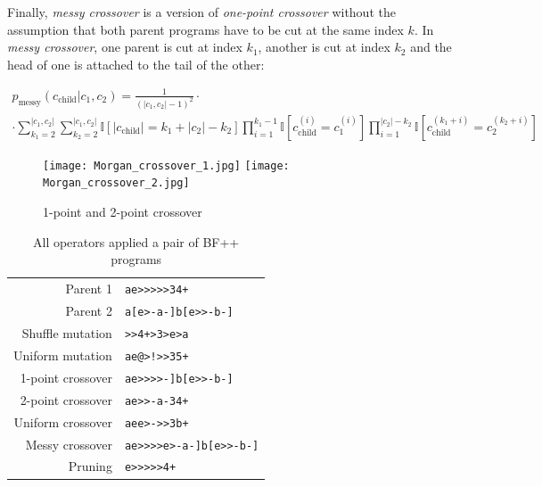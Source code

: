 Finally, \emph{messy crossover} is a version of \emph{one-point crossover} without the assumption that both parent programs have to be cut at the same index $k$.
In \emph{messy crossover}, one parent is cut at index $k_1$, another is cut at index $k_2$ and the head of one is attached to the tail of the other:

\begin{multline}
    p_\text{messy}(c_\text{child}|c_1,c_2) = \frac{1}{(|c_1,c_2|-1)^2} \cdot \\ \cdot \sum\limits_{k_1=2}^{|c_1,c_2|} \sum\limits_{k_2=2}^{|c_1,c_2|} \mathbb{I}[|c_\text{child}|=k_1+|c_2|-k_2] \prod\limits_{i=1}^{k_1-1} \mathbb{I}[c_\text{child}^{(i)} = c_1^{(i)}] \prod\limits_{i=1}^{|c_2|-k_2} \mathbb{I}[c_\text{child}^{(k_1+i)} = c_2^{(k_2+i)}]
\end{multline}

\begin{figure}
    \centering
    \texttt{[image: Morgan\_crossover\_1.jpg]}
    \texttt{[image: Morgan\_crossover\_2.jpg]}
    \caption{1-point and 2-point crossover \cite{evocritique}}
    \label{fig:crossover}
\end{figure}

\begin{table}
    \centering
    \begin{tabular}{r|l}
         Parent 1 & \color{blue}\verb|ae>>>>>34+| \\
         Parent 2 & \color{red}\verb|a[e>-a-]b[e>>-b-]| \\
         \midrule
         Shuffle mutation & \color{blue}\verb|>>4+>3>e>a| \\
         Uniform mutation & \color{blue}\verb|ae|\color{black}\verb|@|\color{blue}\verb|>|\color{black}\verb|!|\color{blue}\verb|>>3|\color{black}\verb|5|\color{blue}\verb|+| \\
         1-point crossover & \color{blue}\verb|ae>>>>|\color{red}\verb|-]b[e>>-b-]| \\
         2-point crossover & \color{blue}\verb|ae>|\color{red}\verb|>-a-|\color{blue}\verb|34+| \\
         Uniform crossover & \color{blue}\verb|ae|\color{red}\verb|e|\color{blue}\verb|>|\color{red}\verb|-|\color{blue}\verb|>>3|\color{red}\verb|b|\color{blue}\verb|+| \\
         Messy crossover & \color{blue}\verb|ae>>>>|\color{red}\verb|e>-a-]b[e>>-b-]| \\
         Pruning & \color{blue}\verb|e>>>>>4+| \\
    \end{tabular}
    \caption{All operators applied a pair of BF++ programs}
\end{table}


